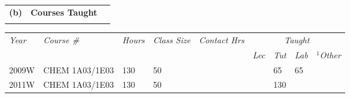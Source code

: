 \documentclass[11pt,notitlepage,english]{report}
\begin{document}

\begin{tabular}{L{.5cm} L{8cm} L{6.9cm}}
  \\
  \textbf{(b)} & \textbf{Courses Taught} \\
  \\
\end{tabular}

\begin{center}
  \begin{longtable}{|l|l|l|l|l|l|l|l|l|}
    \hline
    \multicolumn{1}{|l|}{\multirow{2}{*}{\textit{Year}}} & \multicolumn{1}{l|}{\multirow{2}{*}{\textit{Course \#}}}                                                        & \multicolumn{1}{l|}{\multirow{2}{*}{\textit{Hours}}} & \multicolumn{1}{l|}{\multirow{2}{*}{\textit{Class Size}}} & \multicolumn{1}{l|}{\multirow{2}{*}{\textit{Contact Hrs}}} & \multicolumn{4}{c|}{\textit{Taught}}                                                                                                               \\ \cline{6-9}
    \multicolumn{1}{|l|}{}                               & \multicolumn{1}{l|}{}                                                                                           & \multicolumn{1}{l|}{}                                & \multicolumn{1}{l|}{}                                     & \multicolumn{1}{l|}{}                                      & \multicolumn{1}{l|}{\textit{Lec}}    & \multicolumn{1}{l|}{\textit{Tut}} & \multicolumn{1}{l|}{\textit{Lab}} & \multicolumn{1}{l|}{\textit{$^{1}$Other}} \\ \hline
    2009W                                                & CHEM 1A03/1E03                                                                                                  & 130                                                  & 50                                                        &                                                            &                                      & 65                                & 65                                &                                     \\ \hline
    2011W                                                & CHEM 1A03/1E03                                                                                                  & 130                                                  & 50                                                        &                                                            &                                      & 130                               &                                   &                                     \\ \hline

\end{longtable}
\end{center}
\end{document}
